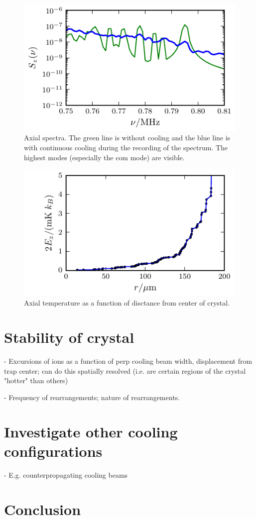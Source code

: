 \documentclass[
  aps,
  reprint,
  twoside,
  showpacs,
  amsmath,
  amssymb,
  floatfix
]{revtex4-1}
\begin{document}
\begin{figure}
\center\includegraphics{./figures/axialSpectraZoomedIn}
\caption{Axial spectra.  The green line is without cooling and the blue
  line is with continuous cooling during the recording of the spectrum.
The highest modes (especially the com mode) are visible. }
  \label{fig:axialSpectraZoomedIn}
\end{figure}

\begin{figure}
\center\includegraphics{./figures/axialTemperature}
\caption{Axial temperature as a function of disctance from center of
  crystal.  }
  \label{fig:axialTemperatures}
\end{figure}



\section{Stability of crystal}
\label{sec:stability}

- Excursions of ions as a function of perp cooling beam width,
  displacement from trap center; can do this spatially resolved (i.e.
      are certain regions of the crystal "hotter" than others)

- Frequency of rearrangements; nature of rearrangements.


\section{Investigate other cooling configurations}

- E.g. counterpropagating cooling beams



\section{Conclusion}
\label{sec:conclusion}
\end{document}

